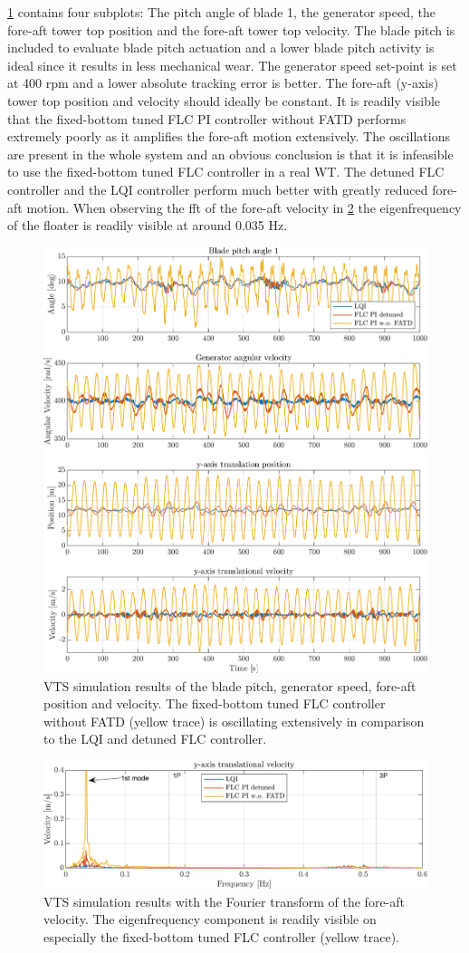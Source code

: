 \cref{fig:vts_3_th_w_py_vy} contains four subplots: The pitch angle of blade 1, the generator speed, the fore-aft tower top position and the fore-aft tower top velocity. The blade pitch is included to evaluate blade pitch actuation and a lower blade pitch activity is ideal since it results in less mechanical wear. The generator speed set-point is set at 400 rpm and a lower absolute tracking error is better. The fore-aft (y-axis) tower top position and velocity should ideally be constant. It is readily visible that the fixed-bottom tuned FLC PI controller without FATD performs extremely poorly as it amplifies the fore-aft motion extensively. The oscillations are present in the whole system and an obvious conclusion is that it is infeasible to use the fixed-bottom tuned FLC controller in a real WT. The detuned FLC controller and the LQI controller perform much better with greatly reduced fore-aft motion. When observing the fft of the fore-aft velocity in \cref{fig:vts_4_fft_py} the eigenfrequency of the floater is readily visible at around 0.035 Hz.

\begin{figure}[h]
	\centering
	\includegraphics[width=0.7\linewidth]{Graphics/TestResults/VTSplotting/3_th_w_py_vy.png}
	\caption{VTS simulation results of the blade pitch, generator speed, fore-aft position and velocity. The fixed-bottom tuned FLC controller without FATD (yellow trace) is oscillating extensively in comparison to the LQI and detuned FLC controller.}
	\label{fig:vts_3_th_w_py_vy}
\end{figure}
\begin{figure}[h]
	\centering
	\includegraphics[width=0.7\linewidth]{Graphics/TestResults/VTSplotting/4_fft_py.png}
	\caption{VTS simulation results with the Fourier transform of the fore-aft velocity. The eigenfrequency component is readily visible on especially the fixed-bottom tuned FLC controller (yellow trace).}
	\label{fig:vts_4_fft_py}
\end{figure}

